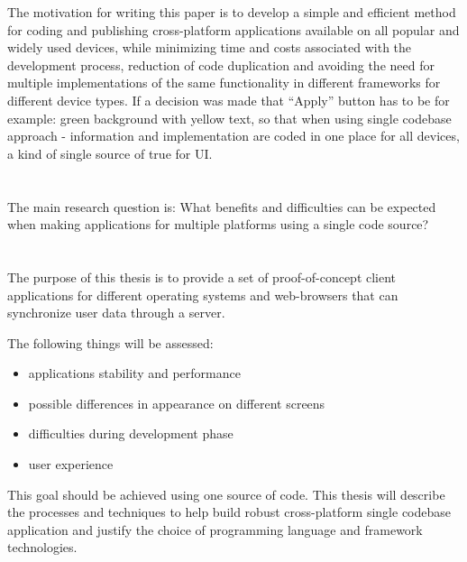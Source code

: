The motivation for writing this paper is to develop a simple and efficient method for coding and publishing cross-platform applications available on all popular and widely used devices, while minimizing time and costs associated with the development process, reduction of code duplication and avoiding the need for multiple implementations of the same functionality in different frameworks for different device types. If a decision was made that “Apply” button has to be for example: green background with yellow text, so that when using single codebase approach - information and implementation are coded in one place for all devices, a kind of single source of true for UI.


\section{}%
\label{sec:onderzoeksvraag}


The main research question is:  What benefits and difficulties can be expected when making applications for multiple platforms using a single code source?

\section{}%
\label{sec:onderzoeksdoelstelling}


The purpose of this thesis is to provide a set of proof-of-concept client applications for different operating systems and web-browsers that can synchronize user data through a server. 

The following things will be assessed:
\begin{itemize}
    \item  applications stability and performance
    \item  possible differences in appearance on different screens
    \item  difficulties during development phase
    \item  user experience
\end{itemize}
This goal should be achieved using one source of code. This thesis will describe the processes and techniques to help build robust cross-platform single codebase application and justify the choice of programming language and framework technologies.


